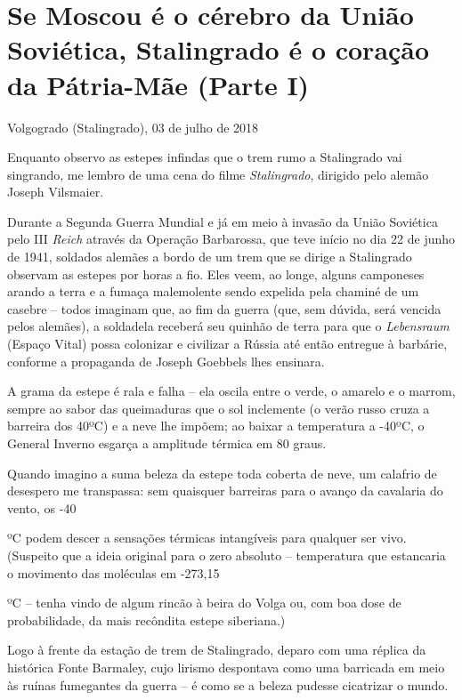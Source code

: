 \chapter*{Se Moscou é o cérebro da União Soviética, Stalingrado é o coração da Pátria-Mãe (Parte I)}

\begin{flushright}
Volgogrado (Stalingrado), 03 de julho de 2018
\end{flushright}

Enquanto observo as estepes infindas que o trem rumo a Stalingrado vai
singrando, me lembro de uma cena do filme \emph{Stalingrado}, dirigido
pelo alemão Joseph Vilsmaier.

Durante a Segunda Guerra Mundial e já em meio à invasão da União
Soviética pelo III \emph{Reich} através da Operação Barbarossa, que teve
início no dia 22 de junho de 1941, soldados alemães a bordo de um trem
que se dirige a Stalingrado observam as estepes por horas a fio. Eles
veem, ao longe, alguns camponeses arando a terra e a fumaça malemolente
sendo expelida pela chaminé de um casebre -- todos imaginam que, ao fim
da guerra (que, sem dúvida, será vencida pelos alemães), a soldadela
receberá seu quinhão de terra para que o \emph{Lebensraum} (Espaço
Vital) possa colonizar e civilizar a Rússia até então entregue à
barbárie, conforme a propaganda de Joseph Goebbels lhes ensinara.

A grama da estepe é rala e falha -- ela oscila entre o verde, o amarelo
e o marrom, sempre ao sabor das queimaduras que o sol inclemente (o
verão russo cruza a barreira dos 40ºC) e a neve lhe impõem; ao baixar a
temperatura a -40ºC, o General Inverno esgarça a amplitude térmica em 80
graus.

Quando imagino a suma beleza da estepe toda coberta de neve, um calafrio
de desespero me transpassa: sem quaisquer barreiras para o avanço da
cavalaria do vento, os -40

ºC podem descer a sensações térmicas intangíveis para qualquer ser vivo.
(Suspeito que a ideia original para o zero absoluto -- temperatura que
estancaria o movimento das moléculas em -273,15

ºC -- tenha vindo de algum rincão à beira do Volga ou, com boa dose de
probabilidade, da mais recôndita estepe siberiana.)

Logo à frente da estação de trem de Stalingrado, deparo com uma réplica
da histórica Fonte Barmaley, cujo lirismo despontava como uma barricada
em meio às ruínas fumegantes da guerra -- é como se a beleza pudesse
cicatrizar o mundo.

